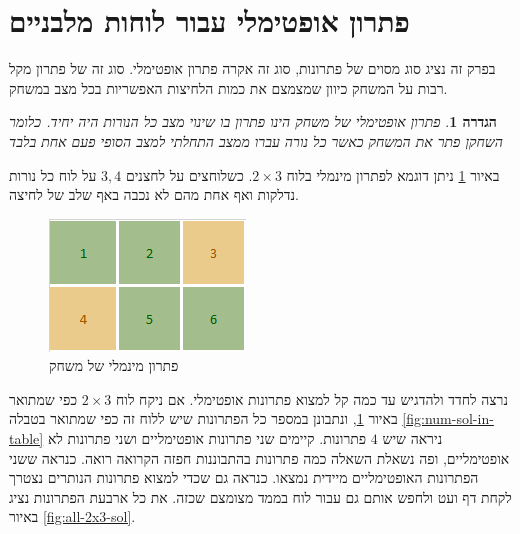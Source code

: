 \documentclass[12pt,leqno]{article}
\theoremstyle{theoremdd}
\newtheorem{definition}{הגדרה}[section]
\begin{document}
\section{פתרון אופטימלי עבור לוחות מלבניים}
בפרק זה נציג סוג מסוים של פתרונות,
סוג זה אקרה פתרון אופטימלי.
סוג זה של פתרון מקל רבות על המשחק 
כיוון שמצמצם את כמות הלחיצות האפשריות בכל מצב במשחק.
\begin{definition}
    \label{def: opt-sol}
    פתרון אופטימלי של משחק הינו פתרון 
    בו שינוי מצב כל הנורות 
    היה יחיד.
    כלומר 
    השחקן פתר את המשחק כאשר 
    כל נורה עברו ממצב התחלתי למצב הסופי פעם אחת בלבד
\end{definition}
באיור 
\ref{fig: min sol 2x3}
ניתן דוגמא לפתרון מינמלי 
בלוח 
$2 \times 3$.
כשלוחצים על לחצנים 
$3, 4$
על לוח כל נורות נדלקות ואף 
אחת מהם לא נכבה באף שלב של לחיצה.

\begin{figure}[ht]
    \caption{פתרון מינמלי של משחק}
    \label{fig: min sol 2x3}
    \centering
    \includegraphics[width=.3\textwidth,keepaspectratio]{images/min_sol_2x3.PNG}
\end{figure}

נרצה לחדד ולהדגיש עד כמה קל למצוא פתרונות אופטימלי.
אם ניקח לוח 
$2 \times 3$
כפי שמתואר 
באיור 
\ref{fig: min sol 2x3},
ונתבונן במספר כל הפתרונות שיש ללוח זה
כפי
שמתואר בטבלה 
\ref{fig:num-sol-in-table}
ניראה שיש 
$4$
פתרונות.
קיימים שני פתרונות אופטימליים 
ושני פתרונות לא אופטימליים,
ופה נשאלת השאלה כמה פתרונות בהתבוננות חפזה הקרואה רואה.
כנראה ששני הפתרונות האופטימליים מיידית נמצאו. כנראה גם שכדי למצוא פתרונות הנותרים 
נצטרך לקחת דף ועט ולחפש אותם גם עבור לוח בממד מצומצם שכזה.
את כל ארבעת הפתרונות נציג באיור 
\ref{fig:all-2x3-sol}.
\end{document}
